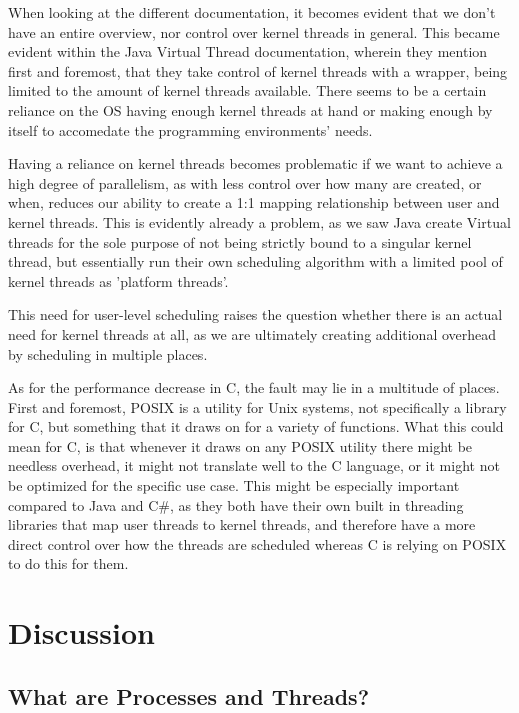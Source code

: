\documentclass[12pt,a4paper]{article}
\begin{document}
When looking at the different documentation, it becomes evident that we don't have an entire overview, nor control over kernel threads in general. This became evident within the Java Virtual Thread documentation, wherein they mention first and foremost, that they take control of kernel threads with a wrapper, being limited to the amount of kernel threads available. There seems to be a certain reliance on the OS having enough kernel threads at hand or making enough by itself to accomedate the programming environments' needs. 

Having a reliance on kernel threads becomes problematic if we want to achieve a high degree of parallelism, as with less control over how many are created, or when, reduces our ability to create a 1:1 mapping relationship between user and kernel threads. This is evidently already a problem, as we saw Java create Virtual threads for the sole purpose of not being strictly bound to a singular kernel thread, but essentially run their own scheduling algorithm with a limited pool of kernel threads as 'platform threads'. 

This need for user-level scheduling raises the question whether there is an actual need for kernel threads at all, as we are ultimately creating additional overhead by scheduling in multiple places.

As for the performance decrease in C, the fault may lie in a multitude of places. First and foremost, POSIX is a utility for Unix systems, not specifically a library for C, but something that it draws on for a variety of functions. What this could mean for C, is that whenever it draws on any POSIX utility there might be needless overhead, it might not translate well to the C language, or it might not be optimized for the specific use case. This might be especially important compared to Java and C\#, as they both have their own built in threading libraries that map user threads to kernel threads, and therefore have a more direct control over how the threads are scheduled whereas C is relying on POSIX to do this for them.

\section{Discussion}

\subsection{What are Processes and Threads?}
\end{document}
